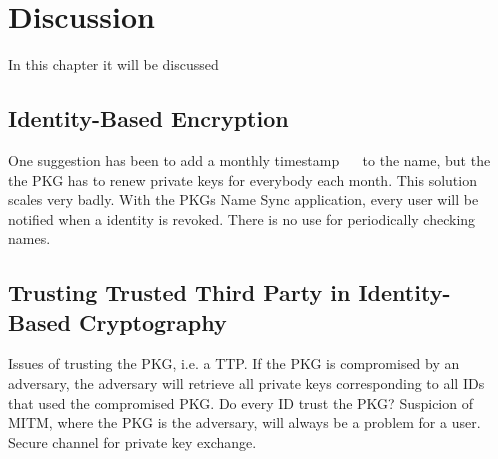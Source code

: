 \chapter{Discussion}
In this chapter it will be discussed 

\section{Identity-Based Encryption}
One suggestion has been to add a monthly timestamp~\cite{DBLP:journals/iacr/BoldyrevaGK12} ~\cite{DBLP:conf/ctrsa/LibertV09}  to the name, but the the \gls{PKG} has to renew private keys for everybody each month. 
This solution scales very badly.
With the \gls{PKG}s Name Sync application, every user will be notified when a identity is revoked.
There is no use for periodically checking names.

\section{Trusting Trusted Third Party in Identity-Based Cryptography}
Issues of trusting the \gls{PKG}, i.e. a \gls{TTP}. 
If the \gls{PKG} is compromised by an adversary, the adversary will retrieve all private keys corresponding to all IDs that used the compromised \gls{PKG}. 
Do every ID trust the \gls{PKG}? Suspicion of \gls{MITM}, where the \gls{PKG} is the adversary, will always be a problem for a user.
Secure channel for private key exchange. 